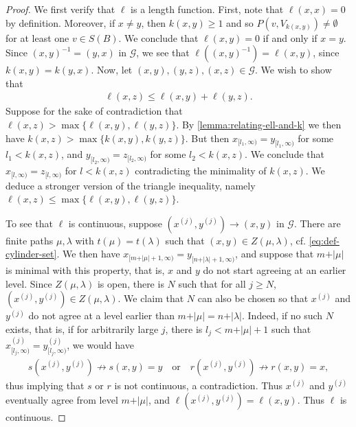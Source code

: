 \documentclass[11pt,a4paper,oneside,final,reqno]{amsart}
\theoremstyle{definition}
\newcommand{\G}{\mathcal{G}}
\numberwithin{equation}{section}
\begin{document}
	\begin{proof}
		We first verify that $\ell$ is a length function. 
		First, note that $\ell(x,x) = 0$ by definition. Moreover, if $x\neq y$, then $k(x,y)\geq 1$ and so $P(v, V_{k(x,y)}) \neq \emptyset$ for at least one $v \in S(B)$. We conclude that $\ell(x,y) = 0$ if and only if $x = y$. 
		Since $(x,y)^{-1} = (y,x)$ in $\G$, we see that $\ell((x,y)^{-1}) =  \ell(x,y)$, since $k(x,y) = k(y,x)$. 
		Now, let $(x,y), (y,z), (x,z) \in \G$. We wish to show that
		\begin{align*}
			\ell(x,z) \leq \ell(x,y) + \ell(y,z).
		\end{align*}
		Suppose for the sake of contradiction that $\ell(x,z) > \max \{ \ell(x,y), \ell(y,z)\}$. By \cref{lemma:relating-ell-and-k} we then have $k(x,z) > \max \{ k(x,y), k(y,z) \}$. But then $x_{[l_1, \infty)} = y_{[l_1, \infty)}$ for some $l_1 < k(x,z)$, and $y_{[l_2, \infty)} = z_{[l_2, \infty)}$ for some $l_2 < k(x,z)$.   We conclude that $x_{[l, \infty)} = z_{[l, \infty)}$ for $l < k(x,z)$ contradicting the minimality of $k(x,z)$. We deduce a stronger version of the triangle inequality, namely $\ell(x,z) \leq \max \{ \ell(x,y) , \ell(y,z) \}$. 
 
		
		To see that $\ell$ is continuous, suppose $(x^{(j)}, y^{(j)}) \to (x,y)$ in $\G$. There are finite paths $\mu, \lambda$ with $t(\mu) = t(\lambda)$ such that $(x,y) \in Z(\mu, \lambda)$, cf. \eqref{eq:def-cylinder-set}. We then have $x_{[m +\vert \mu  \vert + 1 , \infty)} = y_{[n + \vert \lambda \vert + 1 , \infty)}$, and suppose that $m + \vert \mu \vert$ is minimal with this property, that is, $x$ and $y$ do not start agreeing at an earlier level. Since $Z(\mu, \lambda)$ is open, there is $N$ such that for all $j \geq N$, $(x^{(j)}, y^{(j)}) \in Z(\mu, \lambda)$. We claim that $N$ can also be chosen so that $x^{(j)}$ and $y^{(j)}$ do not agree at a level earlier than $m + \vert \mu \vert = n + \vert \lambda \vert$. Indeed, if no such $N$ exists, that is, if for arbitrarily large $j$, there is $l_j < m + \vert \mu \vert +1$ such that $x^{(j)}_{[l_j, \infty)} =  y^{(j)}_{[l_j, \infty)}$, we would have
		\begin{align*}
			s(x^{(j)}, y^{(j)}) \not \to s(x,y) = y \quad \text{or} \quad r(x^{(j)}, y^{(j)}) \not \to r(x,y) = x,
		\end{align*}
		thus implying that $s$ or $r$ is not continuous, a contradiction. Thus $x^{(j)}$ and $y^{(j)}$ eventually agree from level $m + \vert \mu \vert $, and $\ell (x^{(j)}, y^{(j)}) = \ell (x,y)$. Thus $\ell$ is continuous. 
	\end{proof}
\end{document}

